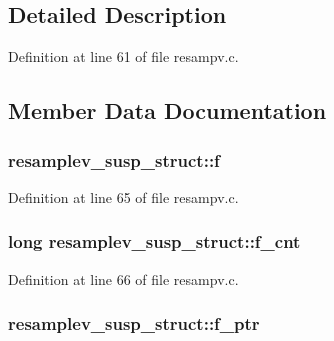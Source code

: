 \subsection{Detailed Description}


Definition at line 61 of file resampv.\+c.



\subsection{Member Data Documentation}
\subsubsection[{\texorpdfstring{f}{f}}]{ resamplev\+\_\+susp\+\_\+struct\+::f}\hypertarget{structresamplev__susp__struct_a4e390c990c2826522cc600b33ef3f3d8}{}\label{structresamplev__susp__struct_a4e390c990c2826522cc600b33ef3f3d8}


Definition at line 65 of file resampv.\+c.

\subsubsection[{\texorpdfstring{f\+\_\+cnt}{f_cnt}}]{\setlength{\rightskip}{0pt plus 5cm}long resamplev\+\_\+susp\+\_\+struct\+::f\+\_\+cnt}\hypertarget{structresamplev__susp__struct_a49c69750011f86978c130336f65eec29}{}\label{structresamplev__susp__struct_a49c69750011f86978c130336f65eec29}


Definition at line 66 of file resampv.\+c.

\subsubsection[{\texorpdfstring{f\+\_\+ptr}{f_ptr}}]{ resamplev\+\_\+susp\+\_\+struct\+::f\+\_\+ptr}\hypertarget{structresamplev__susp__struct_acefca25d401d362e145b1b7e9f0cec08}{}\label{structresamplev__susp__struct_acefca25d401d362e145b1b7e9f0cec08}


